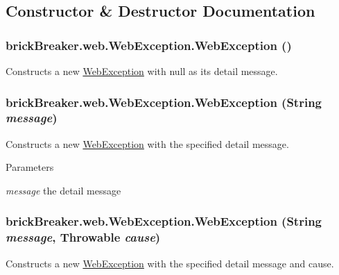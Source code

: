 \subsection{Constructor \& Destructor Documentation}
\hypertarget{classbrick_breaker_1_1web_1_1_web_exception_a2f0867d6facf3647c37b8acf4bcef16a}{
\subsubsection[{WebException}]{\setlength{\rightskip}{0pt plus 5cm}brickBreaker.web.WebException.WebException ()}}
\label{classbrick_breaker_1_1web_1_1_web_exception_a2f0867d6facf3647c37b8acf4bcef16a}
Constructs a new {\ttfamily \hyperlink{classbrick_breaker_1_1web_1_1_web_exception}{WebException}} with {\ttfamily null} as its detail message. \hypertarget{classbrick_breaker_1_1web_1_1_web_exception_af02e7ea5958f56cfe748bd6e332487e1}{
\subsubsection[{WebException}]{\setlength{\rightskip}{0pt plus 5cm}brickBreaker.web.WebException.WebException (String {\em message})}}
\label{classbrick_breaker_1_1web_1_1_web_exception_af02e7ea5958f56cfe748bd6e332487e1}
Constructs a new {\ttfamily \hyperlink{classbrick_breaker_1_1web_1_1_web_exception}{WebException}} with the specified detail message.


\begin{DoxyParams}{Parameters}
\item[{\em message}]the detail message \end{DoxyParams}
\hypertarget{classbrick_breaker_1_1web_1_1_web_exception_a2ef20379c84581f51570f9cae306a3f0}{
\subsubsection[{WebException}]{\setlength{\rightskip}{0pt plus 5cm}brickBreaker.web.WebException.WebException (String {\em message}, \/  Throwable {\em cause})}}
\label{classbrick_breaker_1_1web_1_1_web_exception_a2ef20379c84581f51570f9cae306a3f0}
Constructs a new {\ttfamily \hyperlink{classbrick_breaker_1_1web_1_1_web_exception}{WebException}} with the specified detail message and cause.


